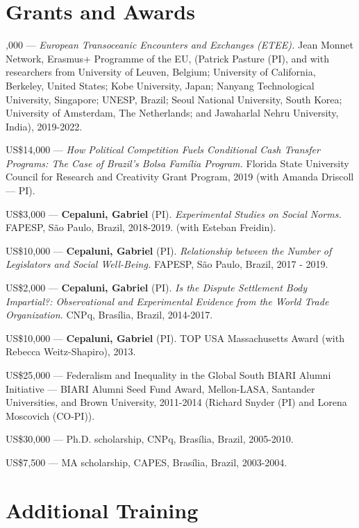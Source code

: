 \documentclass[a4paper,11.5pt]{article}
\renewenvironment{itemize}{
	\begin{list}{}{
			\setlength{\leftmargin}{1.5em}
		}
		}{
	\end{list}
}
\begin{document}
\section*{Grants and Awards}

\begin{itemize}
	\item {},000 --- \emph{European Transoceanic Encounters and Exchanges (ETEE).} Jean Monnet Network, Erasmus+ Programme of the EU, (Patrick Pasture (PI), and with researchers from University of Leuven, Belgium; University of California, Berkeley, United States; Kobe University, Japan; Nanyang Technological University, Singapore; UNESP, Brazil; Seoul National University, South Korea; University of Amsterdam, The Netherlands; and Jawaharlal Nehru University, India), 2019-2022.
	\item US\$14,000 --- \emph{How Political Competition Fuels Conditional Cash Transfer Programs: The Case of Brazil’s Bolsa Família Program.}  Florida State University Council for Research and Creativity Grant Program, 2019 (with Amanda Driscoll --- PI).
	\item US\$3,000 --- \textbf{Cepaluni, Gabriel} (PI). \emph{Experimental Studies on Social Norms.} FAPESP, São Paulo, Brazil, 2018-2019. (with Esteban Freidin).
	\item US\$10,000 --- \textbf{Cepaluni, Gabriel} (PI). \emph{Relationship between the Number of Legislators and Social Well-Being.} FAPESP, São Paulo, Brazil, 2017 - 2019.
	\item US\$2,000 --- \textbf{Cepaluni, Gabriel} (PI). \emph{Is the Dispute Settlement Body Impartial?: Observational and Experimental Evidence from the World Trade Organization.} CNPq, Brasília, Brazil, 2014-2017.
	\item US\$10,000 --- \textbf{Cepaluni, Gabriel} (PI). TOP USA Massachusetts Award (with Rebecca Weitz-Shapiro), 2013.
	\item US\$25,000 --- Federalism and Inequality in the Global South BIARI Alumni Initiative --- BIARI Alumni Seed Fund Award, Mellon-LASA, Santander Universities, and Brown University, 2011-2014 (Richard Snyder (PI) and Lorena Moscovich (CO-PI)).
	\item US\$30,000 --- Ph.D. scholarship, CNPq, Brasília, Brazil, 2005-2010.
	\item US\$7,500 --- MA scholarship, CAPES, Brasília, Brazil, 2003-2004.
\end{itemize}

\section*{Additional Training}
\end{document}
